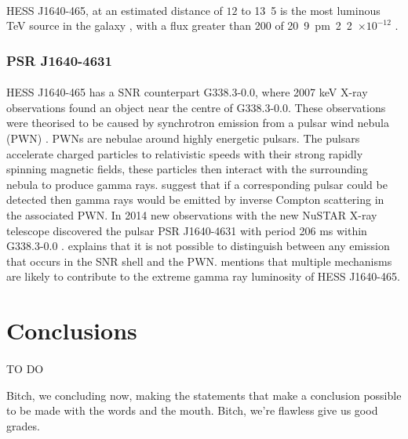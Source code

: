 \documentclass[a4paper, titlepage, oneside]{article}
\newcommand{\e}[1]{\ensuremath{\times 10^{#1}}}
\newcommand{\parsec}{\mathrm{pc}}
\newcommand{\photon}{\mathrm{ph}}
\begin{document}
\begin{multicols}{2}
\paragraph{}
HESS J1640-465, at an estimated distance of \(12\) to \unit{13.5}{\kilo\parsec} is the most luminous TeV source in the galaxy \parencite{Gotthelf:2014}, with a flux greater than \unit{200}{\giga\electronvolt} of \unit{20.9\pm2.2\e{-12}}{\photon\usk\centi\metre\rpsquared\usk\reciprocal\second} \parencite{Aharonian:2006}.

\subsubsection{PSR J1640-4631}
\paragraph{}
HESS J1640-465 has a SNR counterpart G338.3-0.0, where 2007 keV X-ray observations found an object near the centre of G338.3-0.0. These observations were theorised to be caused by synchrotron emission from a pulsar wind nebula (PWN) \parencite{Funk:2007}. PWNs are nebulae around highly energetic pulsars. The pulsars accelerate charged particles to relativistic speeds with their strong rapidly spinning magnetic fields, these particles then interact with the surrounding nebula to produce gamma rays. \textcite{Funk:2007} suggest that if a corresponding pulsar could be detected then gamma rays would be emitted by inverse Compton scattering in the associated PWN. In 2014 new observations with the new NuSTAR X-ray telescope discovered the pulsar PSR J1640-4631 with period 206 ms within G338.3-0.0 \parencite{Gotthelf:2014}. \textcite{Gotthelf:2014} explains that it is not possible to distinguish between any emission that occurs in the SNR shell and the PWN. \textcite{Gotthelf:2014} mentions that multiple mechanisms are likely to contribute to the extreme gamma ray luminosity of HESS J1640-465.

\section{Conclusions} %
\paragraph{}
TO DO

Bitch, we concluding now, making the statements that make a conclusion possible to be made with the words and the mouth. Bitch, we're flawless give us good grades.
\end{multicols}
\end{document}
